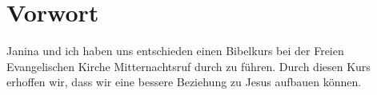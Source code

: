 \chapter{Vorwort}
Janina und ich haben uns entschieden einen Bibelkurs bei der Freien Evangelischen Kirche Mitternachtsruf durch zu führen. Durch diesen Kurs erhoffen wir, dass wir eine bessere Beziehung zu Jesus aufbauen können.
\cite{ag_bibel_kommentar}